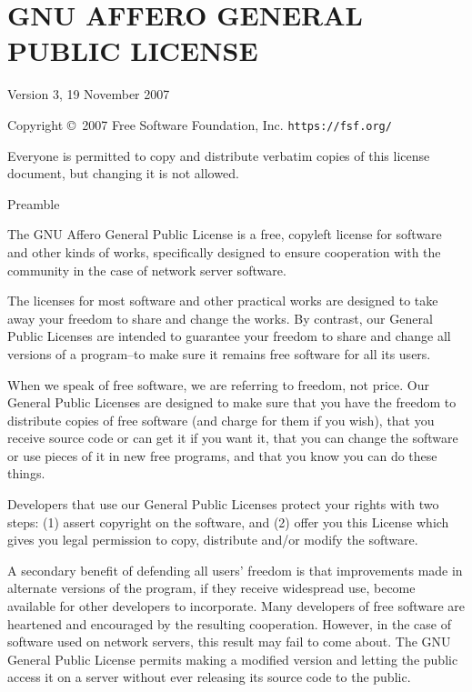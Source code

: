 \documentclass{article}%
\begin{document}
\clearpage
\section{GNU AFFERO GENERAL PUBLIC LICENSE}

\begin{center}
{\parindent 0in

Version 3, 19 November 2007

Copyright \copyright\    2007 Free Software Foundation, Inc. \texttt{https://fsf.org/}

\bigskip
Everyone is permitted to copy and distribute verbatim copies of this
license document, but changing it is not allowed.}

\end{center}

\begin{center}
{\Large \sc Preamble}
\end{center}

The GNU Affero General Public License is a free, copyleft license
for software and other kinds of works, specifically designed to ensure
cooperation with the community in the case of network server software.

The licenses for most software and other practical works are
designed to take away your freedom to share and change the works.        By
contrast, our General Public Licenses are intended to guarantee your
freedom to share and change all versions of a program--to make sure it
remains free software for all its users.

When we speak of free software, we are referring to freedom, not
price.  Our General Public Licenses are designed to make sure that you
have the freedom to distribute copies of free software (and charge for
them if you wish), that you receive source code or can get it if you
want it, that you can change the software or use pieces of it in new
free programs, and that you know you can do these things.

Developers that use our General Public Licenses protect your rights
with two steps: (1) assert copyright on the software, and (2) offer
you this License which gives you legal permission to copy, distribute
and/or modify the software.

A secondary benefit of defending all users' freedom is that
improvements made in alternate versions of the program, if they
receive widespread use, become available for other developers to
incorporate.    Many developers of free software are heartened and
encouraged by the resulting cooperation.        However, in the case of
software used on network servers, this result may fail to come about.
The GNU General Public License permits making a modified version and
letting the public access it on a server without ever releasing its
source code to the public.
\end{document}
